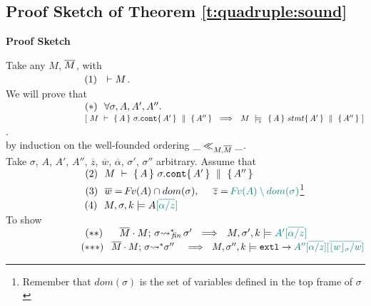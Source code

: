 \newcommand{\SPSF}{\SPS \ \ \ \ \ \ \ }

\subsection{Proof Sketch of Theorem \ref{t:quadruple:sound} }
\label{s:app:proof:sketch;quadruples}
\noindent
\vspace{.2cm}
  {\textbf{Proof Sketch}} 


\noindent
Take any $M$, $\overline{M}$, with\\ 
$\strut \ \ \hspace{2.3cm} \ \ (1) \ \ \vdash M $.
\\
We will prove that\\
$\strut \ \ \hspace{2.3cm} \ \ (*)\ \ \forall \sigma, A, A', A''.$\\
$\strut \ \ \hspace{2.3cm} \ \ \ \ \  \ \ [ \ M\ \vdash\  \quadruple {A} {\sigma.\prg{cont}} {A'} {A''}  \ \ \Longrightarrow \ \    M\ \modelsD\  \quadruple {A} {stmt} {A'} {A''}\ ]$.\\
by induction on the well-founded ordering  $\_ \ll_{M,\overline{M}}  \_$.
\\
Take $\sigma$, $A$, $A'$, $A''$, $\overline z$, $\overline w$, $\overline \alpha$, $\sigma'$, $\sigma''$  arbitrary. Assume that\\
$\strut \ \ \hspace{2.3cm} \ \ (2) \ \ M\ \vdash\  \quadruple {A} {\sigma.\prg{cont}} {A'} {A''}$\\
$\strut \ \ \hspace{2.3cm} \ \ (3) \ \ \overline {w}=\fv(A)\cap dom(\sigma), \  \ \ \  \overline z = \sdN{\fv(A)\setminus dom(\sigma)}$\footnote{Remember that $dom(\sigma)$ is the set of variables defined in the top frame of $\sigma$} \\
$\strut \ \ \hspace{2.3cm} \ \ (4) \ \ \satDAssertFrom M  \sigma k   {A\sdN{[{\overline { \alpha/z}]}}}$\\
To show\\
$\strut \ \ \hspace{2.3cm} \ \ (**)\ \ \  \ \    \leadstoBoundedStarFin {\Mtwo\cdot M}  {\sigma}  {\sigma'}\ \ \Longrightarrow\ \     \satDAssertFrom M  {\sigma'} k   {\sdN{A'}\sdN{[{\overline {\alpha/z}]}}}$\\
$\strut \ \ \hspace{2.3cm} \ \ (*\!*\!*) \ \ \,    \leadstoBoundedStar  {\Mtwo\cdot M}  {\sigma}  {\sigma''}\ \, \ \ \Longrightarrow\ \     \satDAssertFrom M  {\sigma''}  k  \extThis \rightarrow {\sdN{A''[{\overline {\alpha/z}}][\overline{\interpret \sigma {w}/w}]}}$
 
